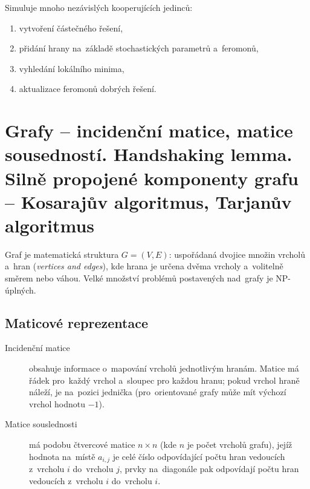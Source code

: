 Simuluje mnoho nezávislých kooperujících jedinců:

\begin{enumerate}
    \item vytvoření částečného řešení,
    \item přidání hrany na~základě stochastických parametrů a~feromonů,
    \item vyhledání lokálního minima,
    \item aktualizace feromonů dobrých řešení.
\end{enumerate}

% 

\clearpage
\section{Grafy -- incidenční matice, matice sousedností. Handshaking lemma. Silně propojené komponenty grafu -- Kosarajův algoritmus, Tarjanův algoritmus}

Graf je matematická struktura $G = (V, E)$: uspořádaná dvojice množin vrcholů a~hran (\emph{vertices and edges}), kde hrana je určena dvěma vrcholy a~volitelně směrem nebo váhou.
Velké množství problémů postavených nad~grafy je NP-úplných.

\subsection{Maticové reprezentace}

\begin{description}
    \item[Incidenční matice] obsahuje informace o~mapování vrcholů jednotlivým hranám.
        Matice má řádek pro~každý vrchol a~sloupec pro každou hranu; pokud vrchol hraně náleží, je na~pozici jednička (pro~orientované grafy může mít výchozí vrchol hodnotu $-1$).
    \item[Matice souslednosti] má podobu čtvercové matice $n \times n$ (kde $n$ je počet vrcholů grafu), jejíž hodnota na~místě $a_{i,j}$ je celé číslo odpovídající počtu hran vedoucích z~vrcholu $i$ do~vrcholu $j$, prvky na~diagonále pak odpovídají počtu hran vedoucích z~vrcholu $i$ do~vrcholu $i$.
\end{description}



